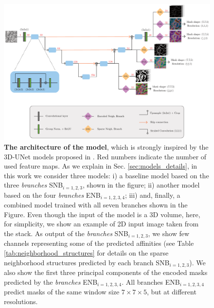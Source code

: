 \begin{figure}[t]
\centering
        \includegraphics[width=\textwidth]{./figures/LSIMasks/UNet_architecture.pdf} %
        \vspace{1em}
        \caption{\textbf{The architecture of the model}, which is strongly inspired by the 3D-UNet models proposed in \cite{lee2017superhuman,funke2018large}. 
        Red numbers indicate the number of used feature maps.
        As we explain in Sec. \ref{sec:models_details}, in this work we consider three models: i) a baseline model based on the three \emph{\sparseBr branches} SNB$_{i=1,2,3}$, shown in the figure; ii) another model based on the four \emph{\encBr branches} ENB$_{i=1,2,3,4}$; iii) and, finally, a combined model trained with all seven branches shown in the Figure.
        Even though the input of the model is a 3D volume, here, for simplicity, we show an example of 2D input image taken from the stack. As output of the \emph{\sparseBr branches} SNB$_{i=1,2,3}$, we show few channels representing some of the predicted affinities (see Table \ref{tab:neighborhood_structures} for details on the sparse neighborhood structures predicted by each branch SNB$_{i=1,2,3}$). We also show the first three principal components of the encoded masks predicted by the \emph{\encBr branches} ENB$_{i=1,2,3,4}$. All branches ENB$_{i=1,2,3,4}$ predict \maskname masks of the same window size $7 \times 7 \times 5$, but at different resolutions.}
    \label{fig:model_architecture}
\end{figure}

